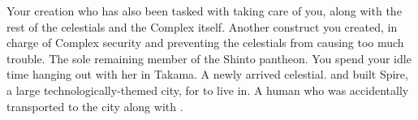 \documentclass[char]{guardians}
\begin{document}
\begin{contacts}
  \contact{\cCaretaker{}} Your creation who has also been tasked with taking care of you, along with the rest of the celestials and the Complex itself.
  \contact{\cWarden{}} Another construct you created, in charge of Complex security and preventing the celestials from causing too much trouble.
  \contact{\cAmaterasu{}} The sole remaining member of the Shinto pantheon. You spend your idle time hanging out with her in Takama.
  \contact{\cUnity{}} A newly arrived celestial. \cWarden{} and \cCaretaker{} built Spire, a large technologically-themed city, for \cUnity{} to live in.
  \contact{\cKachiko{}} A human who was accidentally transported to the city along with \cUnity{}.
\end{contacts}
\end{document}

